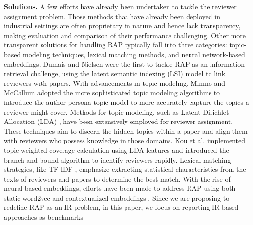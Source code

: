 \textbf{Solutions.}
A few efforts have already been undertaken to tackle the reviewer assignment problem. Those methods that have already been deployed in industrial settings are often proprietary in nature and hence lack transparency, making evaluation and comparison of their performance challenging. Other more transparent solutions for handling RAP typically fall into three categories: topic-based modeling techniques, lexical matching methods, and neural network-based embeddings.
Dumais and Nielsen \cite{Susan1992automatedrap} were the first to tackle RAP as an information retrieval challenge, using the latent semantic indexing (LSI) model to link reviewers with papers. With advancements in topic modeling, Mimno and McCallum \cite{Mimno2007ExpertiseMF} adopted the more sophisticated topic modeling algorithms to introduce the author-persona-topic model to more accurately capture the topics a reviewer might cover. Methods for topic modeling, such as Latent Dirichlet Allocation (LDA) \cite{Mimno2007ExpertiseMF,kou2015weighted}, have been extensively employed for reviewer assignment. These techniques aim to discern the hidden topics within a paper and align them with reviewers who possess knowledge in those domains. Kou et al. \cite{kou2015weighted} implemented topic-weighted coverage calculation using LDA features and introduced the branch-and-bound algorithm to identify reviewers rapidly.
Lexical matching strategies, like TF-IDF \cite{peng2017time}, emphasize extracting statistical characteristics from the texts of reviewers and papers to determine the best match. With the rise of neural-based embeddings, efforts have been made to address RAP using both static word2vec and contextualized embeddings \cite{ogunleye2017proposed,devlin2018bert,mikolov2013efficient}. %
Since we are proposing to redefine RAP as an IR problem, in this paper, we focus on reporting IR-based approaches as benchmarks. %


